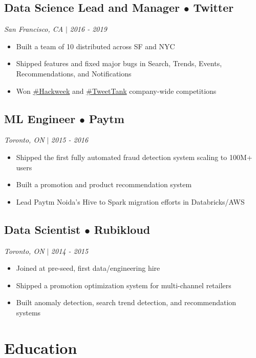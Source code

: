 \documentclass[11pt,letterpaper]{article}
\begin{document}
\subsection*{\textbf{Data Science Lead and Manager} $\bullet$ Twitter}
\textit{San Francisco, CA} $|$ \textit{2016 - 2019}

\begin{itemize}
    \item Built a team of 10 distributed across SF and NYC
    \item Shipped features and fixed major bugs in Search, Trends, Events, Recommendations, and Notifications
    \item Won \href{https://x.com/jadeloyzaga/status/1142237141495189504}{\#Hackweek} and \href{https://x.com/djpardis/status/1089036783050842113}{\#TweetTank} company-wide competitions
\end{itemize}

\subsection*{\textbf{ML Engineer} $\bullet$ Paytm}
\textit{Toronto, ON} $|$ \textit{2015 - 2016}

\begin{itemize}
    \item Shipped the first fully automated fraud detection system scaling to 100M+ users
    \item Built a promotion and product recommendation system
    \item Lead Paytm Noida's Hive to Spark migration efforts in Databricks/AWS
\end{itemize}

\subsection*{\textbf{Data Scientist} $\bullet$ Rubikloud}
\textit{Toronto, ON} $|$ \textit{2014 - 2015}

\begin{itemize}
    \item Joined at pre-seed, first data/engineering hire
    \item Shipped a promotion optimization system for multi-channel retailers
    \item Built anomaly detection, search trend detection, and recommendation systems
\end{itemize}

\section*{Education}
\end{document}
